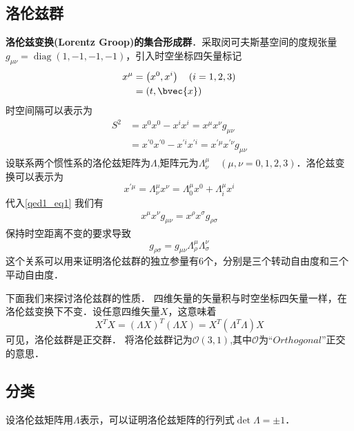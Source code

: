 \subsection{洛伦兹群}
\textbf{洛伦兹变换(Lorentz Groop)的集合形成群}．采取闵可夫斯基空间的度规张量$g_{\mu \nu}=\operatorname{diag}(1,-1,-1,-1)$，引入时空坐标四矢量标记
\begin{equation}
\begin{aligned}
x^{\mu} &=\left(x^{0}, x^{i}\right) \quad(i=1,2,3)\\
&=(t, \bvec{x})
\end{aligned}
\end{equation}
时空间隔可以表示为
\begin{equation}\label{qed1_eq1}\begin{aligned}
S^{2} &=x^{0} x^{0}-x^{i} x^{i}=x^{\mu} x^{\nu} g_{\mu \nu} \\
&=x^{\prime 0} x^{\prime 0}-x^{\prime i} x^{\prime i}=x^{\prime \mu} x^{\prime \nu} g_{\mu \nu}
\end{aligned}\end{equation}
设联系两个惯性系的洛伦兹矩阵为$\Lambda$,矩阵元为$\Lambda_{\nu}^{\mu}\quad(\mu,\nu=0,1,2,3)$．洛伦兹变换可以表示为
\begin{equation}\label{qed1_eq2}x^{\prime \mu}=\Lambda_{\nu}^{\mu} x^{\nu}=\Lambda_{0}^{\mu} x^{0}+\Lambda_{i}^{\mu} x^{i}\end{equation}
代入\autoref{qed1_eq1} 我们有
\begin{align}
x^{\mu} x^{\nu} g_{\mu \nu}=x^{\rho} x^{\sigma} g_{\rho \sigma}
\end{align}
保持时空距离不变的要求导致
\begin{equation}\label{qed1_eq3}g_{\rho \sigma}=g_{\mu \nu} \Lambda_{\rho}^{\mu} \Lambda_{\sigma}^{\nu}\end{equation}
这个关系可以用来证明洛伦兹群的独立参量有6个，分别是三个转动自由度和三个平动自由度．

下面我们来探讨洛伦兹群的性质．
四维矢量的矢量积与时空坐标四矢量一样，在洛伦兹变换下不变．设任意四维矢量$X$，这意味着
\begin{equation}
X^TX=(\Lambda X)^T(\Lambda X)=X^T(\Lambda^T\Lambda)X
\end{equation}
可见，洛伦兹群是正交群．
将洛伦兹群记为$\mathcal{O}(3,1)$,其中$\mathcal{O}$为“$Orthogonal$”正交的意思．
\subsection{分类}
设洛伦兹矩阵用$\Lambda$表示，可以证明洛伦兹矩阵的行列式$\det \Lambda=\pm1$．

